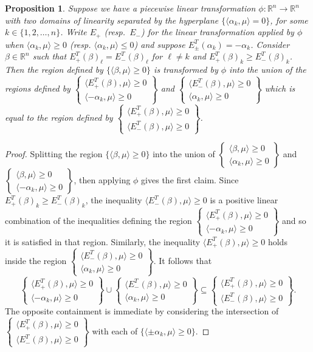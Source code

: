 \documentclass{amsart}
\newtheorem{proposition}[theorem]{Proposition}
\numberwithin{theorem}{section}
\newcommand{\RR}{\mathbb{R}}
\begin{document}
  \begin{proposition}
    Suppose we have a piecewise linear transformation $\phi:\RR^n\to\RR^n$ with two domains of linearity separated by the hyperplane $\{\langle\alpha_k,\mu\rangle = 0\}$, for some $k\in\{1,2,\ldots,n\}$.
    Write $E_+$ (resp.~$E_-$) for the linear transformation applied by $\phi$ when $\langle\alpha_k,\mu\rangle\ge0$ (resp. $\langle\alpha_k,\mu\rangle\le 0$) and suppose $E_\pm^T(\alpha_k)=-\alpha_k$.
    Consider $\beta\in\RR^n$ such that $E_+^T(\beta)_\ell=E_-^T(\beta)_\ell$ for $\ell\ne k$ and $E_+^T(\beta)_k\ge E_-^T(\beta)_k$.
    Then the region defined by $\{\langle\beta,\mu\rangle\ge0\}$ is transformed by $\phi$ into the union of the regions defined by $\left\{\substack{\langle E_+^T(\beta),\mu\rangle \ge 0\\ \langle -\alpha_k,\mu\rangle \ge 0}\right\}$ and $\left\{\substack{\langle E_-^T(\beta),\mu\rangle \ge 0\\ \langle \alpha_k,\mu\rangle \ge 0}\right\}$ which is equal to the region defined by $\left\{\substack{\langle E_+^T(\beta),\mu\rangle \ge 0\\ \langle E_-^T(\beta),\mu\rangle \ge 0}\right\}$.
  \end{proposition}
  \begin{proof}
    Splitting the region $\{\langle\beta,\mu\rangle\ge0\}$ into the union of $\left\{\substack{\langle \beta,\mu\rangle \ge 0\\ \langle \alpha_k,\mu\rangle \ge 0}\right\}$ and $\left\{\substack{\langle \beta,\mu\rangle \ge 0\\ \langle -\alpha_k,\mu\rangle \ge 0}\right\}$, then applying $\phi$ gives the first claim.
    Since $E_+^T(\beta)_k\ge E_-^T(\beta)_k$, the inequality $\langle E_-^T(\beta),\mu\rangle \ge 0$ is a positive linear combination of the inequalities defining the region $\left\{\substack{\langle E_+^T(\beta),\mu\rangle \ge 0\\ \langle -\alpha_k,\mu\rangle \ge 0}\right\}$ and so it is satisfied in that region.
    Similarly, the inequality $\langle E_+^T(\beta),\mu\rangle \ge 0$ holds inside the region $\left\{\substack{\langle E_-^T(\beta),\mu\rangle \ge 0\\ \langle \alpha_k,\mu\rangle \ge 0}\right\}$.
    It follows that 
    \[\left\{\substack{\langle E_+^T(\beta),\mu\rangle \ge 0\\ \langle -\alpha_k,\mu\rangle \ge 0}\right\} \cup \left\{\substack{\langle E_-^T(\beta),\mu\rangle \ge 0\\ \langle \alpha_k,\mu\rangle \ge 0}\right\} \subseteq \left\{\substack{\langle E_+^T(\beta),\mu\rangle \ge 0\\ \langle E_-^T(\beta),\mu\rangle \ge 0}\right\}.\]
    The opposite containment is immediate by considering the intersection of $\left\{\substack{\langle E_+^T(\beta),\mu\rangle \ge 0\\ \langle E_-^T(\beta),\mu\rangle \ge 0}\right\}$ with each of $\{\langle\pm\alpha_k,\mu\rangle\ge0\}$. 
  \end{proof}
\end{document}
